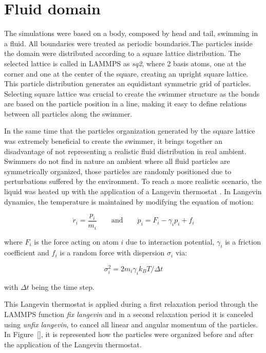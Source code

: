 \section{Fluid domain}
\label{sec:section 2}

The simulations were based on a body, composed by head and tail, swimming in a fluid. All boundaries were treated as periodic boundaries.The particles inside the domain were distributed according to a square lattice distribution. The selected lattice is
called in LAMMPS as \textit{sq2}, where 2 basis atoms, one at the corner and one at the center of the square, creating an upright square lattice. This particle distribution 
generates an equidistant symmetric grid of particles. Selecting square lattice was crucial to create the swimmer structure as the bonds are based on the particle position in a line, 
making it easy to define relations between all particles along the swimmer.\par
In the same time that the particles organization generated by the square lattice was extremely beneficial to create the swimmer, it brings together an disadvantage of not representing
a realistic fluid distribution in real ambient. Swimmers do not find in nature an ambient where all fluid particles are symmetrically organized, those particles are randomly 
positioned due to perturbations suffered by the environment. To reach a more realistic scenario, the liquid was heated up with the application of a Langevin thermostat \cite{schneider_molecular-dynamics_1978}.
In Langevin dynamics, the temperature is maintained by modifying the equation of motion:

\begin{equation}
\dot{r}_{i} = \frac{p_{i}}{m_{i}} \quad \quad \text{and} \quad \quad \dot{p}_{i}= F_{i} - \gamma_{i} p_{i} + f_{i}
\end{equation}

where $F_{i}$ is the force acting on atom $i$ due to interaction potential, $\gamma_{i}$ is a friction coefficient and $f_{i}$ is a random force with dispersion $\sigma_{i}$ via:


\begin{equation}
\sigma_{i}^2 = 2 m_{i} \gamma_{i} k_{B} T / \Delta t
\end{equation}

with $\Delta t$ being the time step.\par

This Langevin thermostat is applied during a first relaxation period through the LAMMPS function \textit{fix langevin} and in a second relaxation period it is canceled using
\textit{unfix langevin}, to cancel all linear and angular momentum of the particles. In Figure~\ref{}, it is represented how the particles were organized before and after the
application of the Langevin thermostat.



